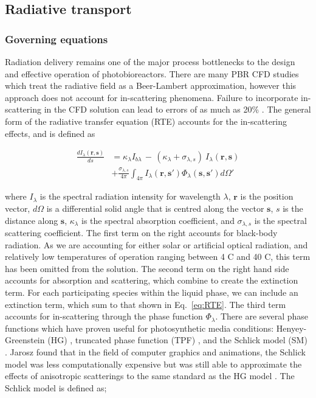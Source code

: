 \subsection{Radiative transport}
\subsubsection{Governing equations}
Radiation delivery remains one of the major process bottlenecks to the design and effective operation of photobioreactors. There are many PBR CFD studies which treat the radiative field as a Beer-Lambert approximation, however this approach does not account for in-scattering phenomena. Failure to incorporate in-scattering in the CFD solution can lead to errors of as much as 20\% \cite{berberoglu2007}. The general form of the radiative transfer equation (RTE) accounts for the in-scattering effects, and is defined as

\begin{align}
\frac{dI_\lambda (\mathbf{r}, \mathbf{s}) }{ds} &=  \kappa_{\lambda}I_{b\lambda} \, - \, (\kappa_\lambda + \sigma_{\lambda, s}) \ I_\lambda (\mathbf{r}, \mathbf{s}) \nonumber \\
&+ \frac{\sigma_{\lambda, s}}{4 \pi} \int_{4 \pi} I_\lambda (\mathbf{r}, \mathbf{s'}) \Phi_\lambda(\mathbf{s}, \mathbf{s'}) d\Omega'
\label{eq:RTE}
\end{align}


\noindent where $I_\lambda$ is the spectral radiation intensity for wavelength $\lambda$, $\mathbf{r}$ is the position vector, $d\Omega$ is a differential solid angle that is centred along the vector $\mathbf{s}$, $s$ is the distance along $\mathbf{s}$, $\kappa_\lambda$ is the spectral absorption coefficient, and $\sigma_{\lambda,s}$ is the spectral scattering coefficient. The first term on the right accounts for black-body radiation. As we are accounting for either solar or artificial optical radiation, and relatively low temperatures of operation ranging between 4 \degree C and 40 \degree C, this term has been omitted from the solution. The second term on the right hand side accounts for absorption and scattering,  which combine to create the extinction term. For each participating species within the liquid phase, we can include an extinction term, which sum to that shown in Eq.\ \ref{eq:RTE}. The third term accounts for in-scattering through the phase function $\Phi_\lambda$. 
\skippingparagraph
There are several phase functions which have proven useful for photosynthetic media conditions: Henyey-Greenstein (HG) \cite{kong2014}, truncated phase function (TPF) \cite{berberoglu2007}, and the Schlick model (SM) \cite{jarosz2008}. Jarosz found that in the field of computer graphics and animations, the Schlick model was less computationally expensive but was still able to approximate the effects of anisotropic scatterings to the same standard as the HG model \cite{jarosz2008}. The Schlick model is defined as;

